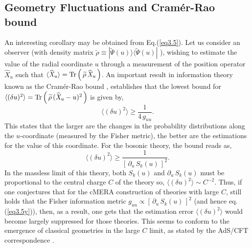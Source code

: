 \documentclass[preprint,aps]{revtex4}
\def\beq{\begin{equation}}
\def\eeq{\end{equation}}
\begin{document}
\subsection*{Geometry Fluctuations and Cram\'er-Rao bound}
\label{CramerRao:bound}
An interesting corollary may be obtained from Eq.(\ref{eq3.5}). Let us consider an observer (with density matrix $\widetilde{\rho} \equiv |\widetilde{\Psi}(u)\rangle \langle \widetilde{\Psi}(u)|$ ), wishing to estimate the value of the radial coordinate $u$ through a measurement of the position operator $\mathit{\widehat{X}_u}$ such that $\langle \mathit{\widehat{X}_u} \rangle = {\rm Tr}\left(\, \widetilde{\rho}\, \mathit{\widehat{X}_u}\, \right) $. An important result in information theory known as the Cram\'er-Rao bound \cite{amari}, establishes that the lowest bound for $\langle (\delta u)^2\rangle = {\rm Tr}\left(\, \widetilde{\rho}\, (\mathit{\widehat{X}_u}-u)^2\, \right)$ is given by,
\beq
\label{eq3.5x}
\langle (\delta u)^2\rangle \geq \frac{1}{4\, g_{uu}}.
\eeq
This states that the larger are the changes in the probability distributions along the $u$-coordinate (measured by the Fisher metric), the better are the estimations for the value of this coordinate. For the bosonic theory, the bound reads as,
\beq
\label{eq3.5y}
\langle (\delta u)^2\rangle \geq \frac{1}{\left[\, \partial_u\, S_k(u)\, \right]^{2}}.
\eeq 
In the massless limit of this theory, both $S_k(u)$ and $\partial_u\, S_k(u)$ must be proportional to the central charge $\mathit{C}$ of the theory so, $\langle (\delta u)^2\rangle \sim \mathit{C}^{-2}$. Thus, if one conjectures that for the cMERA construction of theories with large $C$, still holds that the Fisher information metric $g_{uu} \propto \left[\, \partial_u\, S_k(u)\, \right]^{2}$ (and hence eq.(\ref{eq3.5y})), then, as a result, one gets that the estimation error $\langle (\delta u)^2\rangle $ would become largely suppressed for those theories. This seems to conform to the emergence of classical geometries in the large $\mathit{C}$ limit, as stated by the AdS/CFT correspondence \citep{prog6}.
\end{document}
